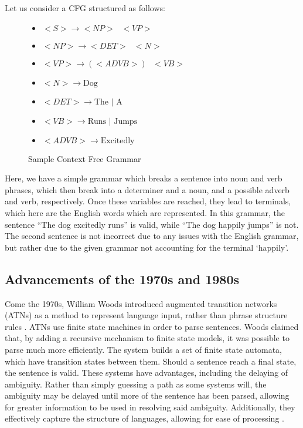 Let us consider a CFG structured as follows:

\begin{center}
\begin{figure}[H]
\begin{center}

\begin{itemize}

	\item $<S> \rightarrow <NP> \text{ } <VP>$
	\item $<NP> \rightarrow <DET> \text{ } <N>$
	\item $<VP> \rightarrow (<ADVB>) \text{ } <VB>$
	\item $<N> \rightarrow \text{Dog}$
	\item $<DET> \rightarrow \text{The | A}$
	\item $<VB> \rightarrow \text{Runs | Jumps}$
	\item $<ADVB> \rightarrow \text{Excitedly}$

\end{itemize}
\end{center}
\caption{Sample Context Free Grammar}
\end{figure}
\end{center}


Here, we have a simple grammar which breaks a sentence into noun and verb phrases, which then break into a determiner and a noun, and a possible adverb and verb, respectively. Once these variables are reached, they lead to terminals, which here are the English words which are represented. In this grammar, the sentence ``The dog excitedly runs'' is valid, while ``The dog happily jumps'' is not. The second sentence is not incorrect due to any issues with the English grammar, but rather due to the given grammar not accounting for the terminal `happily'.



\subsection{Advancements of the 1970s and 1980s}

Come the 1970s, William Woods introduced augmented transition networks (ATNs) as a method to represent language input, rather than phrase structure rules \cite{Woods}. ATNs use finite state machines in order to parse sentences. Woods claimed that, by adding a recursive mechanism to finite state models, it was possible to parse much more efficiently. The system builds a set of finite state automata, which have transition states between them. Should a sentence reach a final state, the sentence is valid. These systems have advantages, including the delaying of ambiguity. Rather than simply guessing a path as some systems will, the ambiguity may be delayed until more of the sentence has been parsed, allowing for greater information to be used in resolving said ambiguity. Additionally, they effectively capture the structure of languages, allowing for ease of processing \cite{ATN}.

